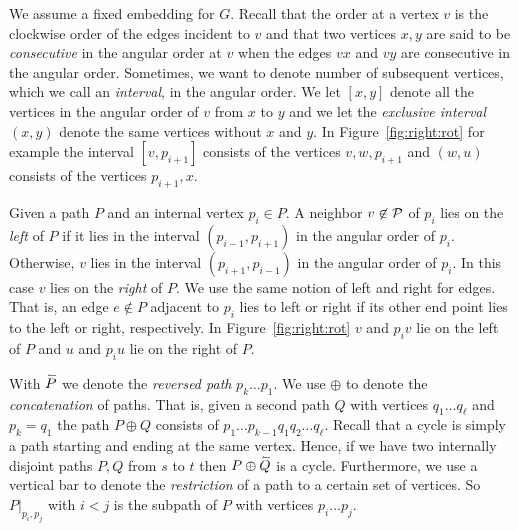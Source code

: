     We assume a fixed embedding for $G$. Recall that the order at a vertex $v$ is the clockwise order of the edges incident to $v$ and that two vertices $x, y$ are said to be \emph{consecutive} in the angular order at $v$ when the edges $vx$ and $vy$ are consecutive in the angular order.
    Sometimes, we want to denote number of subsequent vertices, which we call an \emph{interval}, in the angular order. We let $[x,y]$ denote all the vertices in the angular order of $v$ from $x$ to $y$ and we let the \emph{exclusive interval} $(x,y)$ denote the same vertices without $x$ and $y$. In Figure~\ref{fig:right:rot} for example the interval $[v,p_{i+1}]$ consists of the vertices $v,w,p_{i+1}$ and $(w,u)$ consists of the vertices $p_{i+1}, x$.

    Given a path $P$ and an internal vertex $p_i \in P$. A neighbor $v \not \in \mathcal{P}$ of $p_i$ lies on the \emph{left} of $P$ if it lies in the interval $(p_{i-1}, p_{i+1})$ in the angular order of $p_{i}$. Otherwise, $v$ lies in the interval $(p_{i+1}, p_{i-1})$ in the angular order of $p_i$. In this case $v$ lies on the \emph{right} of $P$.
    We use the same notion of left and right for edges. That is, an edge $e\nin P$ adjacent to $p_i$ lies to left or right if its other end point lies to the left or right, respectively. In Figure~\ref{fig:right:rot} $v$ and $p_i v$ lie on the left of $P$ and $u$ and $p_i u$ lie on the right of $P$.

    With $\accentset{\leftharpoonup}{P}$ we denote the \emph{reversed path} $p_k \ldots p_1$. We use $\oplus$ to denote the \emph{concatenation} of paths.
    That is, given a second path $Q$ with vertices $q_1 \ldots q_\ell$ and $p_k = q_1$ the path $P \oplus Q$ consists of $p_1 \ldots p_{k-1} q_1 q_2 \ldots q_\ell$.
    Recall that a cycle is simply a path starting and ending at the same vertex.
    Hence, if we have two internally disjoint paths $P, Q$ from $s$ to $t$ then $P \oplus \accentset{\leftharpoonup}{Q}$ is a cycle.
    Furthermore, we use a vertical bar to denote the \emph{restriction} of a path to a certain set of vertices. So $P|_{p_i, p_j}$ with $i<j$ is the subpath of $P$ with vertices $p_i \ldots p_j$.

